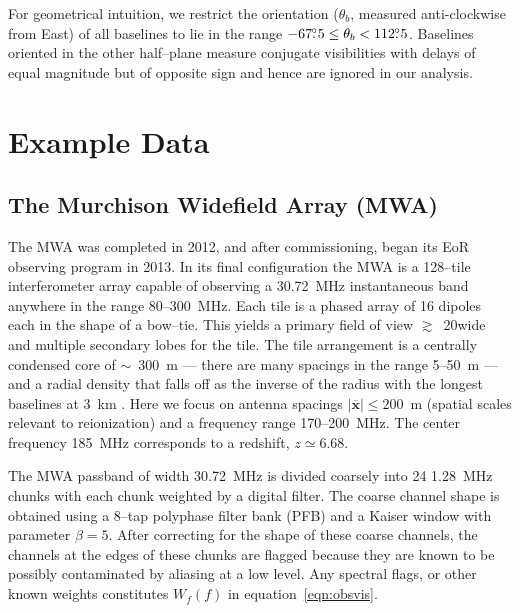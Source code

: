 \documentclass[preprint2,iop,numberedappendix]{emulateapj}
\begin{document}
For geometrical intuition, we restrict the orientation ($\theta_b$, measured anti-clockwise from East) of all baselines to lie in the range $-67\mbox{$.\!\!^\circ$} 5 \leq \theta_b < 112\mbox{$.\!\!^\circ$} 5$. Baselines oriented in the other half--plane measure conjugate visibilities with delays of equal magnitude but of opposite sign and hence are ignored in our analysis.

\section{Example Data}\label{sec:instrument}

\subsection{The Murchison Widefield Array (MWA)}

The MWA was completed in 2012, and after commissioning, began its EoR observing program in 2013. In its final configuration the MWA is a 128--tile interferometer array capable of observing a 30.72~MHz instantaneous band anywhere in the range 80--300~MHz. Each tile is a phased array of 16 dipoles each in the shape of a bow--tie. This yields a primary field of view $\gtrsim$~20\arcdeg wide and multiple secondary lobes for the tile. The tile arrangement is a centrally condensed core of $\sim$~300~m --- there are many spacings in the range 5--50~m --- and a radial density that falls off as the inverse of the radius with the longest baselines at 3~km \citep{bea12}. Here we focus on antenna spacings $|\overline{\mathbf{x}}| \le 200$~m (spatial scales relevant to reionization) and a frequency range 170--200~MHz. The center frequency 185~MHz corresponds to a redshift, $z\simeq 6.68$.

The MWA passband of width 30.72~MHz is divided coarsely into 24 1.28~MHz chunks with each chunk weighted by a digital filter. The coarse channel shape is obtained using a 8--tap polyphase filter bank (PFB) and a Kaiser window with parameter $\beta=5$. After correcting for the shape of these coarse channels, the channels at the edges of these chunks are flagged because they are known to be possibly contaminated by aliasing at a low level. Any spectral flags, or other known weights constitutes $W_f(f)$ in equation~\ref{eqn:obsvis}. 

\end{document}
